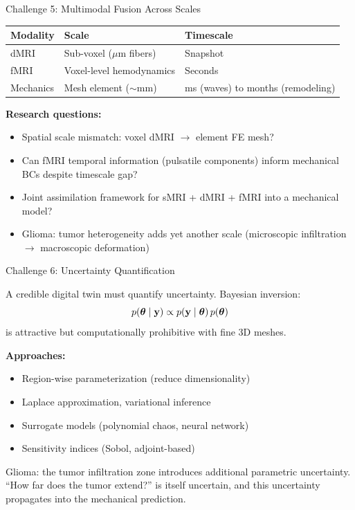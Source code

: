 \begin{frame}{Challenge 5: Multimodal Fusion Across Scales}

  \begin{tabular}{lll}
    \toprule
    \textbf{Modality} & \textbf{Scale} & \textbf{Timescale} \\
    \midrule
    dMRI & Sub-voxel ($\mu$m fibers) & Snapshot \\
    fMRI & Voxel-level hemodynamics & Seconds \\
    Mechanics & Mesh element ($\sim$mm) &
      ms (waves) to months (remodeling) \\
    \bottomrule
  \end{tabular}

  \bigskip

  \textbf{Research questions:}
  \begin{itemize}
    \item Spatial scale mismatch: voxel dMRI $\to$ element FE mesh?
    \item Can fMRI temporal information (pulsatile components)
      inform mechanical BCs despite timescale gap?
    \item Joint assimilation framework for sMRI + dMRI + fMRI into
      a mechanical model?
    \item \alert{Glioma:} tumor heterogeneity adds yet another scale
      (microscopic infiltration $\to$ macroscopic deformation)
  \end{itemize}

\end{frame}

\begin{frame}{Challenge 6: Uncertainty Quantification}

  A credible digital twin must quantify uncertainty.
  Bayesian inversion:
  \[
    p(\bm{\theta} \mid \mathbf{y})
      \propto p(\mathbf{y} \mid \bm{\theta})\,p(\bm{\theta})
  \]
  is attractive but computationally prohibitive with fine 3D meshes.

  \bigskip

  \textbf{Approaches:}
  \begin{itemize}
    \item Region-wise parameterization (reduce dimensionality)
    \item Laplace approximation, variational inference
    \item Surrogate models (polynomial chaos, neural network)
    \item Sensitivity indices (Sobol, adjoint-based)
  \end{itemize}

  \bigskip

  \alert{Glioma:} the tumor infiltration zone introduces additional
  parametric uncertainty. ``How far does the tumor extend?'' is
  itself uncertain, and this uncertainty propagates into the
  mechanical prediction.

\end{frame}

